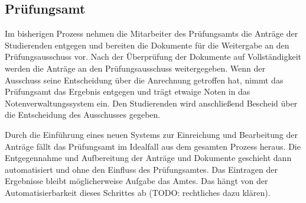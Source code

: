 \subsection{Prüfungsamt}

Im bisherigen Prozess nehmen die Mitarbeiter des Prüfungsamts die Anträge der Studierenden entgegen und bereiten die Dokumente für die Weitergabe an den Prüfungsausschuss vor. Nach der Überprüfung der Dokumente auf Vollständigkeit werden die Anträge an den Prüfungsausschuss weitergegeben. Wenn der Ausschuss seine Entscheidung über die Anrechnung getroffen hat, nimmt das Prüfungsamt das Ergebnis entgegen und trägt etwaige Noten in das Notenverwaltungssystem ein. Den Studierenden wird anschließend Bescheid über die Entscheidung des Ausschusses gegeben.

Durch die Einführung eines neuen Systems zur Einreichung und Bearbeitung der Anträge fällt das Prüfungsamt im Idealfall aus dem gesamten Prozess heraus. Die Entgegennahme und Aufbereitung der Anträge und Dokumente geschieht dann automatisiert und ohne den Einfluss des Prüfungsamtes. Das Eintragen der Ergebnisse bleibt möglicherweise Aufgabe das Amtes. Das hängt von der Automatisierbarkeit dieses Schrittes ab (TODO: rechtliches dazu klären).